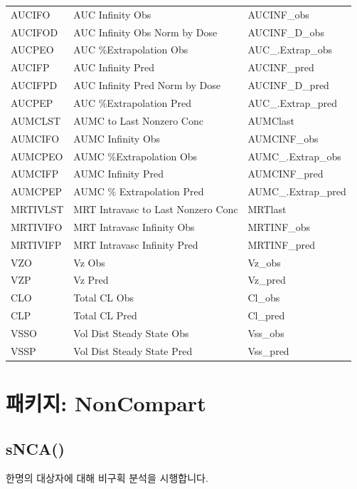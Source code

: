 \documentclass[12pt,]{krantz}
\begin{document}
\begin{longtable}[t]{lll}
AUCIFO & AUC Infinity Obs & AUCINF\_obs\\
AUCIFOD & AUC Infinity Obs Norm by Dose & AUCINF\_D\_obs\\
\addlinespace
AUCPEO & AUC \%Extrapolation Obs & AUC\_.Extrap\_obs\\
AUCIFP & AUC Infinity Pred & AUCINF\_pred\\
AUCIFPD & AUC Infinity Pred Norm by Dose & AUCINF\_D\_pred\\
AUCPEP & AUC \%Extrapolation Pred & AUC\_.Extrap\_pred\\
AUMCLST & AUMC to Last Nonzero Conc & AUMClast\\
\addlinespace
AUMCIFO & AUMC Infinity Obs & AUMCINF\_obs\\
AUMCPEO & AUMC \%Extrapolation Obs & AUMC\_.Extrap\_obs\\
AUMCIFP & AUMC Infinity Pred & AUMCINF\_pred\\
AUMCPEP & AUMC \% Extrapolation Pred & AUMC\_.Extrap\_pred\\
MRTIVLST & MRT Intravasc to Last Nonzero Conc & MRTlast\\
\addlinespace
MRTIVIFO & MRT Intravasc Infinity Obs & MRTINF\_obs\\
MRTIVIFP & MRT Intravasc Infinity Pred & MRTINF\_pred\\
VZO & Vz Obs & Vz\_obs\\
VZP & Vz Pred & Vz\_pred\\
CLO & Total CL Obs & Cl\_obs\\
\addlinespace
CLP & Total CL Pred & Cl\_pred\\
VSSO & Vol Dist Steady State Obs & Vss\_obs\\
VSSP & Vol Dist Steady State Pred & Vss\_pred\\
\bottomrule
\end{longtable}

\chapter{패키지: NonCompart}\label{-noncompart}

\section{sNCA()}\label{snca}

한명의 대상자에 대해 비구획 분석을 시행합니다.
\end{document}
